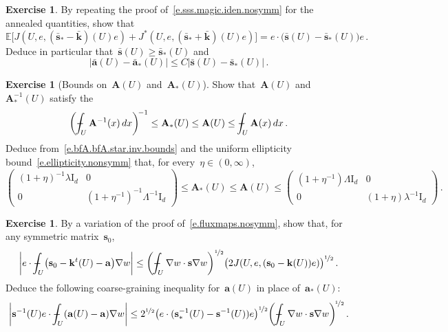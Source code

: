 \documentclass[11pt,twoside]{article} %
\numberwithin{equation}{section}
\theoremstyle{definition}
\newtheorem{exercise}[theorem]{Exercise}
\let\originalleft\left
\let\originalright\right
\renewcommand{\left}{\mathopen{}\mathclose\bgroup\originalleft}
\renewcommand{\right}{\aftergroup\egroup\originalright}
\newcommand*{\Id}{\ensuremath{\mathrm{I}_d}}
\newcommand{\s}{\mathbf{s}}
\renewcommand{\a}{\mathbf{a}}
\renewcommand{\k}{\mathbf{k}}
\newcommand{\ahom}{\bar{\a}}
\newcommand{\shom}{\bar{\mathbf{s}}}
\newcommand{\khom}{\bar{\mathbf{k}}}
\newcommand{\E}{\mathbb{E}}
\def\Xint#1{\mathchoice
{\XXint\displaystyle\textstyle{#1}}%
{\XXint\textstyle\scriptstyle{#1}}%
{\XXint\scriptstyle\scriptscriptstyle{#1}}%
{\XXint\scriptscriptstyle\scriptscriptstyle{#1}}%
\!\int}
\def\XXint#1#2#3{{\setbox0=\hbox{$#1{#2#3}{\int}$}
\vcenter{\hbox{$#2#3$}}\kern-.5\wd0}}
\def\fint{\Xint-}
\newcommand{\bfA}{\mathbf{A}}
\begin{document}
\begin{exercise}
\label{exer.ordering.homs}
By repeating the proof of~\eqref{e.sss.magic.iden.nosymm} for the annealed quantities, show that 
\begin{equation}
\label{e.sss.magic.iden.nosymm.homs}
\E \bigl[ J(U,e,(\shom_*- \khom)(U) e) 
+ J^*(U,e,(\shom_*+\khom)(U) e) \bigr] 
=
e \cdot \bigl( \shom(U) - \shom_*(U) \bigr) e
\,.
\end{equation}
Deduce in particular that~$\shom(U) \geq \shom_*(U)$ and 
\begin{equation*}
|\ahom(U)-\ahom_*(U)| \leq C|\shom(U) - \shom_*(U)|
\,.
\end{equation*}
\end{exercise}


\begin{exercise}[{Bounds on~$\bfA(U)$ and~$\bfA_*(U)$}]
Show that~$\bfA(U)$ and~$\bfA_*^{-1}(U)$ satisfy the
\begin{equation}
\label{e.bfA.bfA.star.inv.bounds}
\biggl( \fint_{U} \bfA^{-1} (x)\,dx \biggr)^{\!-1} \leq \bfA_{*}(U) \leq \bfA(U) \leq
\fint_{U} \bfA  (x)\,dx
\,.
\end{equation}
Deduce from~\eqref{e.bfA.bfA.star.inv.bounds} and the uniform ellipticity bound~\eqref{e.ellipticity.nonsymm} that, for every~$\eta \in (0,\infty)$, 
\begin{equation}
\label{e.bfA.bounds}
\begin{pmatrix} (1{+}\eta)^{-1}  \lambda \Id  & 0 \\ 0 & (1{+}\eta^{-1})^{-1}  \Lambda^{-1}  \Id \end{pmatrix}
\leq \bfA_*(U) 
\leq \bfA(U) 
\leq 
\begin{pmatrix} (1{+}\eta^{-1}) \Lambda  \Id & 0 \\ 0 & (1{+}\eta) \lambda^{-1}  \Id \end{pmatrix}
\,.
\end{equation}
\end{exercise}


\begin{exercise}
By a variation of the proof of~\eqref{e.fluxmaps.nosymm}, show that, for any symmetric matrix~$\s_0$, 
\begin{equation}
\label{e.fluxmaps.nosymm.nostar}
\biggl| e \cdot
\fint_U \bigl( \s_0 - \k^t(U) - \a \bigr) \nabla w
\biggr|
\leq 
\left( \fint_U \nabla w \cdot \s \nabla w \right)^{\nicefrac12} 
\bigl( 2J(U, e , (\s_0 - \k(U) ) e )\bigr )^{\nicefrac12} 
\,.
\end{equation}
Deduce the following coarse-graining inequality for~$\a(U)$ in place of~$\a_*(U)$:
\begin{equation}
\label{e.coarse.graining.nosymm.nostar}
\biggl| \s^{-1} (U) e\cdot \fint_U ( \a(U) - \a ) \nabla w \biggr| 
\leq 
2^{\nicefrac12} 
\bigl( e\cdot( \s_*^{-1} (U) - \s^{-1} (U))e \bigr)^{\nicefrac12} \biggl( \fint_U \nabla w \cdot \s \nabla w \biggr)^{\!\nicefrac12} 
\,.
\end{equation}
\end{exercise}
\end{document}
